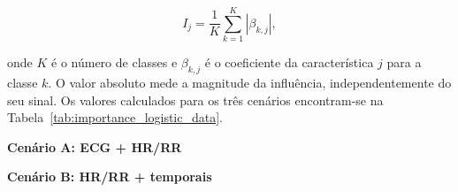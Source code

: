 \begin{equation}
I_j = \frac{1}{K}\sum_{k=1}^{K} |\beta_{k,j}|,
\end{equation}

onde $K$ é o número de classes e $\beta_{k,j}$ é o coeficiente da característica $j$ para a classe $k$. O valor absoluto mede a magnitude da influência, independentemente do seu sinal. Os valores calculados para os três cenários encontram-se na Tabela~\ref{tab:importance_logistic_data}.

\begin{table}[H]
\centering
\scriptsize
\begin{minipage}{0.32\textwidth}\centering
\textbf{Cenário A: ECG + HR/RR}
\end{minipage}\hfill
\begin{minipage}{0.32\textwidth}\centering
\textbf{Cenário B: HR/RR + temporais}
\end{minipage}
\end{table}
